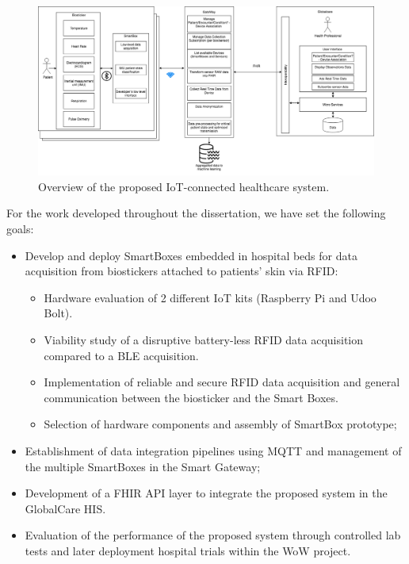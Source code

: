 \begin{figure}[H]
    \centering
    \includegraphics[width=\linewidth]{images/wow-architecture.png}
    \caption{Overview of the proposed \acs{IoT}-connected healthcare system.}
    \label{fig:wow-architecture}
\end{figure}

For the work developed throughout the dissertation, we have set the following goals: 

\begin{itemize}
    \item Develop and deploy SmartBoxes embedded in hospital beds for data acquisition from biostickers attached to patients’ skin via \acs{RFID}:
    \begin{itemize}
        \item Hardware evaluation of 2 different \acs{IoT} kits (Raspberry Pi and Udoo Bolt).
        \item Viability study of a disruptive battery-less \acs{RFID} data acquisition compared to a \acs{BLE} acquisition.
        \item Implementation of reliable and secure \acs{RFID} data acquisition and general communication between the biosticker and the Smart Boxes.
        \item Selection of hardware components and assembly of SmartBox prototype;
    \end{itemize}
    \item Establishment of data integration pipelines using \acs{MQTT} and management of the multiple SmartBoxes in the Smart Gateway;
    \item Development of a \acs{FHIR} \acs{API} layer to integrate the proposed system in the GlobalCare \acs{HIS}.
    \item Evaluation of the performance of the proposed system through controlled lab tests and later deployment hospital trials within the WoW project.
\end{itemize}

